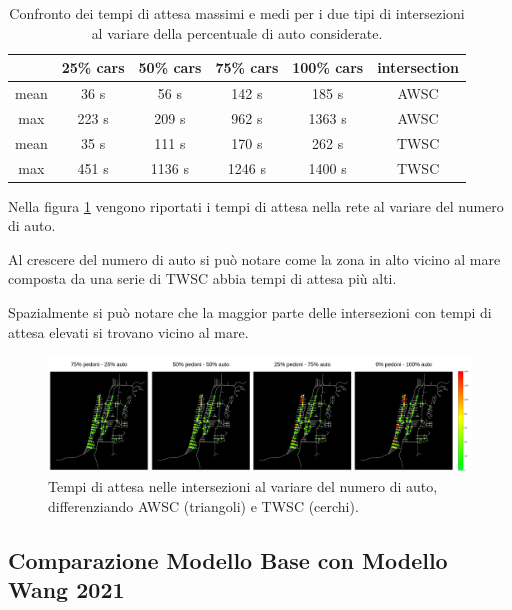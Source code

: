 \begin{table}[ht]
    \centering
    \begin{tabular}{|c|c|c|c|c|c|}
        \hline
             & 25\% cars & 50\% cars & 75\% cars & 100\% cars & intersection \\ \hline
        mean & 36 s      & 56 s      & 142 s     & 185 s      & AWSC         \\ \hline
        max  & 223 s     & 209 s     & 962 s     & 1363 s     & AWSC         \\ \hline
        mean & 35 s      & 111 s     & 170 s     & 262 s      & TWSC         \\ \hline
        max  & 451 s     & 1136 s    & 1246 s    & 1400 s     & TWSC         \\ \hline
    \end{tabular}
    \caption{Confronto dei tempi di attesa massimi e medi per i due tipi di intersezioni al variare della percentuale di auto considerate.}
    \label{tab:analisi-car-delay}
\end{table}

Nella figura \ref{fig:analisi-comparison-car-delay} vengono riportati i tempi di attesa nella rete al variare del numero di auto.

Al crescere del numero di auto si può notare come la zona in alto vicino al mare composta da una serie di TWSC abbia tempi di attesa più
alti.

Spazialmente si può notare che la maggior parte delle intersezioni con tempi di attesa elevati si trovano vicino al mare.

\begin{figure}[ht]
    \includegraphics[width=1\textwidth]{images/analisi/comparison-car-delay.png}
    \caption{Tempi di attesa nelle intersezioni al variare del numero di auto, differenziando AWSC (triangoli) e TWSC (cerchi).}
    \label{fig:analisi-comparison-car-delay}
\end{figure}



\subsection*{Comparazione Modello Base con Modello Wang 2021}

